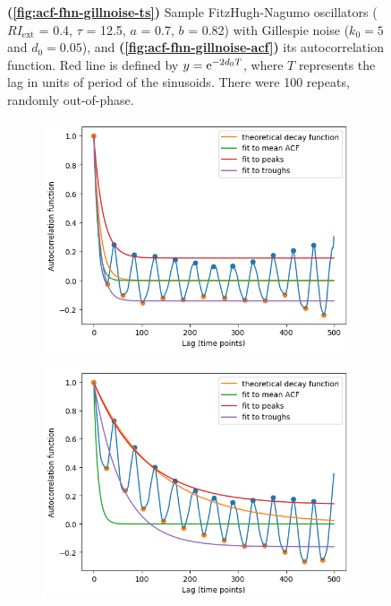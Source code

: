 \begin{figure}
  \caption{
    \textbf{(\ref{fig:acf-fhn-gillnoise-ts})} Sample FitzHugh-Nagumo oscillators ($RI_{\mathrm{ext}}$ = 0.4, $\tau$ = 12.5, $a$ = 0.7, $b$ = 0.82) with Gillespie noise ($k_{0} = 5$ and $d_{0} = 0.05$), and 
    \textbf{(\ref{fig:acf-fhn-gillnoise-acf})} its autocorrelation function.
    Red line is defined by $y = \mathrm{e}^{-2d_{0}T}$, where $T$ represents the lag in units of period of the sinusoids.
    There were 100 repeats, randomly out-of-phase.
  }
  \label{fig:acf-fhn}
\end{figure}


\begin{figure}
  \centering
  \begin{subfigure}[t]{0.45\textwidth}
  \centering
    \includegraphics[width=\linewidth]{fhn_expofit}
    \caption{
    }
    \label{fig:acf-fhn-noiseparams-fit}
  \end{subfigure}%
  \begin{subfigure}[t]{0.45\textwidth}
  \centering
    \includegraphics[width=\linewidth]{fhn_highnts_expofit}
    \caption{
    }
    \label{fig:acf-fhn-noiseparams-fit-highnts}
  \end{subfigure}


\end{figure}
